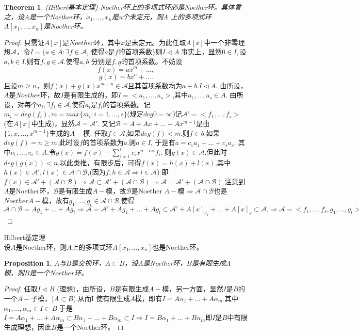 \documentclass[UTF8]{article}
\newtheorem{thm}{Theorem}
\newtheorem{prop}{Proposition}
\begin{document}
\begin{thm}{(Hilbert基本定理)}
	Noether环上的多项式环必是Noether环。具体言之，设A是一个Noether环，$x_1,\ldots,x_n$是n个未定元，则A 上的多项式环$A[x_1,\ldots,x_n]$是Noether环。
\end{thm}
\begin{proof}
	只需证$A[x]$是$Noether$环，其中$x$是未定元。为此任取$A[x]$中一个非零理想$\mathscr{A}$，令$I=\{a\in A:\exists f\in \mathscr{A}$, 使得$a$是$f$的首项系数\}则$I\vartriangleleft A$.事实上，显然$0\in I,$设$a,b\in I$,则有$f,g\in\mathscr{A}$.使得$a,b$ 分别是$f,g$的首项系数。不妨设
	$$f(x)=ax^m+\ldots,$$
	$$g(x)=bx^n+\ldots.$$
	且设$m\geqslant n$，则$f(x)+g(x)x^{m-n}\in \mathscr{A}$且其首项系数均为$a+b.{ }I\vartriangleleft A$. 由所设，$A$是$Noether$环，故$I$是有限生成的，即$I=<a_1,\ldots,a_s>$,其中$a_1,\ldots,a_s\in A.$
	由所设，对每个$a_i,\exists f_i\in\mathscr{A}$,使得$a_i$是$f_i$的首项系数。记$m_i=deg(f_i),m=max\{m_i:i=1,\ldots,s\}$(规定$deg0=\infty$)记$\mathscr{A}'=<f_1,\ldots,f_s>$(在$A[x]$中生成)，显然$\mathscr{A}=\mathscr{A}'.$
	又记$\mathscr{B}=A+Ax+\ldots+Ax^{m-1}$是由$\{1,x,\ldots,x^{m-1}\}$生成的$A-$模.
	任取$f\in\mathscr{A}$,如果$deg(f)<m$,则$f\in b$.如果$deg(f)=n\geq m$.此时设$f$的首项系数为$a$.则$a\in I$, 于是有$a=c_1a_1+\ldots+c_sa_s$, 其中$c_1,\ldots,c_s\in A$.令$g(x)=f(x)-\sum\limits_{i=1}^s{c_ix^{n-mi}f_i}$.
	则$g(x)\in\mathscr{A}$,但此时$deg(g(x))<n$.以此类推，有限步后，可得$f(x)=h(x)+l(x)$,其中$h(x)\in \mathscr{A}',l(x)\in\mathscr{A}\cap\mathscr{B}$,(因为$f,h\in\mathscr{A}\Rightarrow l\in\mathscr{A}$)
	即$f(x)\in\mathscr{A}'+(\mathscr{A}\cap\mathscr{B})\Rightarrow\mathscr{A}\subset\mathscr{A}'+(\mathscr{A}\cap\mathscr{B})\Rightarrow\mathscr{A}=\mathscr{A}'+(\mathscr{A}\cap\mathscr{B})$
	注意到$A$是Noether环，$\mathscr{B}$是有限生成$A-$模，故$\mathscr{B}$是Noether $A-$模$\Rightarrow\mathscr{A}\cap\mathscr{B}$也是$Noether A-$模，故有$g_1,\ldots,g_t\in\mathscr{A}\cap\mathscr{B}$,使得
	$\mathscr{A}\cap\mathscr{B}=Ag_1+\ldots+Ag_t\Rightarrow\mathscr{A}=\mathscr{A}'+Ag_1+\ldots+Ag_t\subset\mathscr{A}'+A[x]_{g_1}+\ldots+A[x]_g\subset\mathscr{A}.\Rightarrow\mathscr{A}=<f_1,\ldots,f_s,g_1,\ldots,g_t>.$
\end{proof}
Hilbert基定理\\
设$A$是Noether环，则$A$上的多项式环$A[x_1,\ldots,x_n]$也是Noether环。
\begin{prop}
	$A$与$B$是交换环，$A\subset B$，设$A$是Noether环，$B$是有限生成$A-$模，则$B$是一个$Noether$环。
\end{prop}
\begin{proof}
	任取$I\vartriangleleft B $ (理想)，由所设，$B$是有限生成$A-$模，另一方面，显然$I$是$B$的一个$A-$子模，($A\subset B$).从而I 使有限生成$A$模，即有$I=A\alpha_1+\ldots+A\alpha_m$.其中$\alpha_1,\ldots,\alpha_m\in I\subset B$.于是$I=A\alpha_1+\ldots+A\alpha_m\subset B\alpha_1+\ldots+B\alpha_m\subset I\Rightarrow I=B\alpha_1+\ldots+B\alpha_m$即$I$是$B$中有限生成理想，因此$B$是一个Noether环。
\end{proof}
\end{document}
